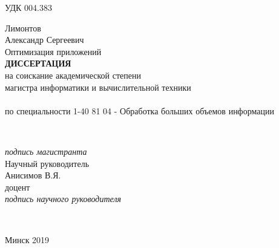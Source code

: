 \begin{titlepage}
\begin{center}
  \end{center}

  УДК 004.383\\[2em]

  \begin{center}
    Лимонтов\\
    Александр Сергеевич
    \\[1em]
    Оптимизация приложений \LB
    \\[3em]
    \textbf{\large\MakeUppercase{Диссертация}}\\
    на соискание академической степени\\магистра информатики и вычислительной техники\\
    \\[1em]
    по специальности 1-40 81 04 - Обработка больших объемов информации
  \end{center}\\[2em]

  \begin{flushright}
    \begin{minipage}{0.4\textwidth}
      \textit{подпись магистранта}\\[1em]
      Научный руководитель\\
      Анисимов В.Я.\\
      доцент\\[1em]
      \textit{подпись научного руководителя}
    \end{minipage}\\[2.2em]
  \end{flushright}

  \mbox{}
  \vfill
  \begin{center}Минск 2019\end{center}
\end{titlepage}
